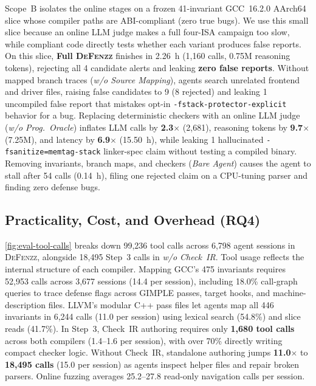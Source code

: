 \documentclass[conference,compsoc]{IEEEtran}
\begin{document}
Scope~B isolates the online stages on a frozen 41-invariant GCC~16.2.0 AArch64 slice whose compiler paths are ABI-compliant (zero true bugs). We use this small slice because an online LLM judge makes a full four-ISA campaign too slow, while compliant code directly tests whether each variant produces false reports. On this slice, \textbf{Full \textsc{DeFenzz}} finishes in 2.26~h (1,160 calls, 0.75M reasoning tokens), rejecting all 4 candidate alerts and leaking \textbf{zero false reports}. Without mapped branch traces (\emph{w/o Source Mapping}), agents search unrelated frontend and driver files, raising false candidates to 9 (8 rejected) and leaking 1 uncompiled false report that mistakes opt-in \texttt{-fstack-protector-explicit} behavior for a bug. Replacing deterministic checkers with an online LLM judge (\emph{w/o Prog.\ Oracle}) inflates LLM calls by \textbf{2.3$\times$} (2,681), reasoning tokens by \textbf{9.7$\times$} (7.25M), and latency by \textbf{6.9$\times$} (15.50~h), while leaking 1 hallucinated \texttt{-fsanitize=memtag-stack} linker-spec claim without testing a compiled binary. Removing invariants, branch maps, and checkers (\emph{Bare Agent}) causes the agent to stall after 54 calls (0.14~h), filing one rejected claim on a CPU-tuning parser and finding zero defense bugs.

\subsection{Practicality, Cost, and Overhead (RQ4)}\label{sec:eval-rq4}

\autoref{fig:eval-tool-calls} breaks down 99,236 tool calls across 6,798 agent sessions in \textsc{DeFenzz}, alongside 18,495 Step~3 calls in \emph{w/o Check~IR}. Tool usage reflects the internal structure of each compiler. Mapping GCC's 475 invariants requires 52,953 calls across 3,677 sessions (14.4 per session), including 18.0\% call-graph queries to trace defense flags across GIMPLE passes, target hooks, and machine-description files. LLVM's modular C++ pass files let agents map all 446 invariants in 6,244 calls (11.0 per session) using lexical search (54.8\%) and slice reads (41.7\%). In Step~3, Check~IR authoring requires only \textbf{1,680 tool calls} across both compilers (1.4--1.6 per session), with over 70\% directly writing compact checker logic. Without Check~IR, standalone authoring jumps \textbf{11.0$\times$} to \textbf{18,495 calls} (15.0 per session) as agents inspect helper files and repair broken parsers. Online fuzzing averages 25.2--27.8 read-only navigation calls per session.
\end{document}
